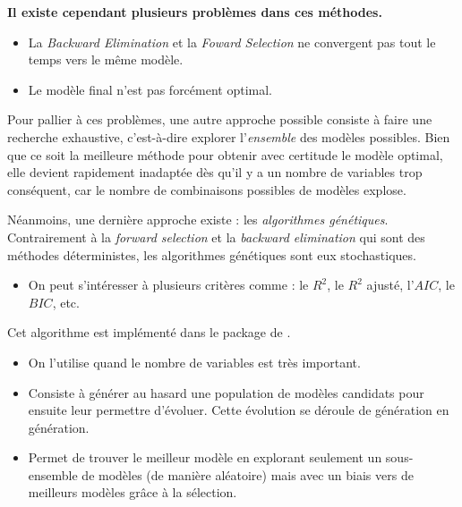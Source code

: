 \documentclass[
  12pt,
]{report}
\providecommand{\tightlist}{%
  \setlength{\itemsep}{0pt}\setlength{\parskip}{0pt}}\usepackage{longtable,booktabs,array}
\renewcommand{\texttt}[1]{\colorbox{light}{\color{highlight}{\ttfamily{#1}}}}
\begin{document}
\begin{tcolorbox}[enhanced jigsaw, left=2mm, coltitle=black, colback=white, colframe=quarto-callout-warning-color-frame, bottomtitle=1mm, opacitybacktitle=0.6, title=\textcolor{quarto-callout-warning-color}{\faExclamationTriangle}\hspace{0.5em}{Limites}, rightrule=.15mm, toprule=.15mm, breakable, opacityback=0, colbacktitle=quarto-callout-warning-color!10!white, toptitle=1mm, titlerule=0mm, arc=.35mm, bottomrule=.15mm, leftrule=.75mm]

\textbf{Il existe cependant plusieurs problèmes dans ces méthodes.}

\begin{itemize}
\item
  La \emph{Backward Elimination} et la \emph{Foward Selection} ne
  convergent pas tout le temps vers le même modèle.
\item
  Le modèle final n'est pas forcément optimal.
\end{itemize}

\end{tcolorbox}

Pour pallier à ces problèmes, une autre approche possible consiste à
faire une recherche exhaustive, c'est-à-dire explorer l'\emph{ensemble}
des modèles possibles. Bien que ce soit la meilleure méthode pour
obtenir avec certitude le modèle optimal, elle devient rapidement
inadaptée dès qu'il y a un nombre de variables trop conséquent, car le
nombre de combinaisons possibles de modèles explose.

Néanmoins, une dernière approche existe : les \emph{algorithmes
génétiques}. Contrairement à la \emph{forward selection} et la
\emph{backward elimination} qui sont des méthodes déterministes, les
algorithmes génétiques sont eux stochastiques.

\begin{itemize}
\tightlist
\item
  On peut s'intéresser à plusieurs critères comme : le \(R^2\), le
  \(R^2\) ajusté, l'\(AIC\), le \(BIC\), etc.
\end{itemize}

Cet algorithme est implémenté dans le package  de
\texttt{\{glmulti\}}.

\begin{itemize}
\item
  On l'utilise quand le nombre de variables est très important.
\item
  Consiste à générer au hasard une population de modèles candidats pour
  ensuite leur permettre d'évoluer. Cette évolution se déroule de
  génération en génération.
\item
  Permet de trouver le meilleur modèle en explorant seulement un
  sous-ensemble de modèles (de manière aléatoire) mais avec un biais
  vers de meilleurs modèles grâce à la sélection.
\end{itemize}
\end{document}
